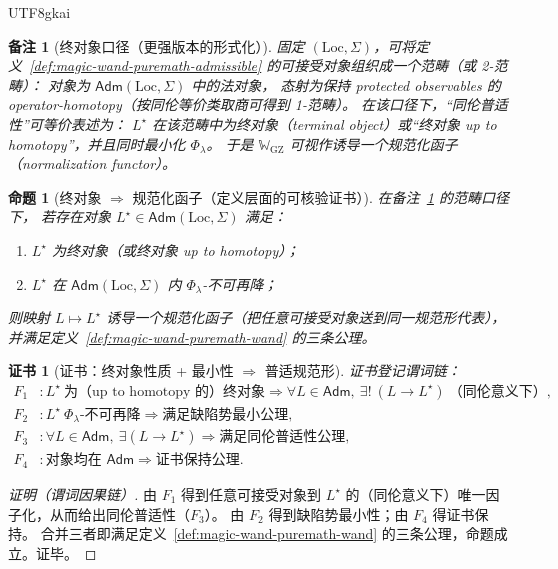 \documentclass[12pt]{article}
\newtheorem{proposition}{命题}[section]
\newtheorem{remark}{备注}[section]
\newtheorem{Certificate}{证书}[section]
\begin{document}
\begin{CJK*}{UTF8}{gkai}
\begin{remark}[终对象口径（更强版本的形式化）]
\label{rem:magic-wand-puremath-terminal}
固定 $(\mathrm{Loc},\Sigma)$，可将定义~\ref{def:magic-wand-puremath-admissible} 的可接受对象组织成一个范畴（或 2-范畴）：
对象为 $\mathsf{Adm}(\mathrm{Loc},\Sigma)$ 中的法对象，
态射为保持 protected observables 的 operator-homotopy（按同伦等价类取商可得到 1-范畴）。
在该口径下，“同伦普适性”可等价表述为：
$L^\star$ 在该范畴中为终对象（terminal object）或“终对象 up to homotopy”，并且同时最小化 $\Phi_\lambda$。
于是 $\mathbb{W}_{\mathrm{GZ}}$ 可视作诱导一个规范化函子（normalization functor）。
\end{remark}

\begin{proposition}[终对象 $\Rightarrow$ 规范化函子（定义层面的可核验证书）]
\label{prop:magic-wand-puremath-terminal-functor}
在备注~\ref{rem:magic-wand-puremath-terminal} 的范畴口径下，
若存在对象 $L^\star\in\mathsf{Adm}(\mathrm{Loc},\Sigma)$ 满足：
\begin{enumerate}
  \item $L^\star$ 为终对象（或终对象 up to homotopy）；
  \item $L^\star$ 在 $\mathsf{Adm}(\mathrm{Loc},\Sigma)$ 内 $\Phi_\lambda$-不可再降；
\end{enumerate}
则映射 $L\mapsto L^\star$ 诱导一个规范化函子（把任意可接受对象送到同一规范形代表），
并满足定义~\ref{def:magic-wand-puremath-wand} 的三条公理。
\end{proposition}

\begin{Certificate}[证书：终对象性质 + 最小性 $\Rightarrow$ 普适规范形]
\label{cert:magic-wand-puremath-terminal-functor}
证书登记谓词链：
\[
\begin{aligned}
  F_1 &: L^\star\ \text{为（up to homotopy 的）终对象}\Rightarrow \forall L\in\mathsf{Adm},\ \exists!\ (L\to L^\star)\
    \text{（同伦意义下）},\\
  F_2 &: L^\star\ \Phi_\lambda\text{-不可再降}\Rightarrow \text{满足缺陷势最小公理},\\
  F_3 &: \forall L\in\mathsf{Adm},\ \exists (L\to L^\star)\Rightarrow \text{满足同伦普适性公理},\\
  F_4 &: \text{对象均在 }\mathsf{Adm}\Rightarrow \text{证书保持公理}.
\end{aligned}
\]
\end{Certificate}

\begin{proof}[证明（谓词因果链）]
由 $F_1$ 得到任意可接受对象到 $L^\star$ 的（同伦意义下）唯一因子化，从而给出同伦普适性（$F_3$）。
由 $F_2$ 得到缺陷势最小性；由 $F_4$ 得证书保持。
合并三者即满足定义~\ref{def:magic-wand-puremath-wand} 的三条公理，命题成立。证毕。
\end{proof}


\end{CJK*}
\end{document}
